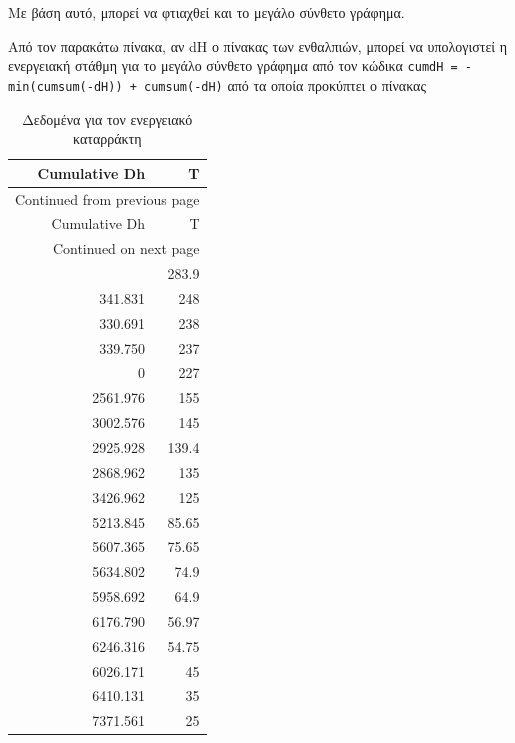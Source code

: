 \documentclass[11pt]{article}
\begin{document}
Με βάση αυτό, μπορεί να φτιαχθεί και το μεγάλο σύνθετο γράφημα.

Από τον παρακάτω πίνακα, αν dH ο πίνακας των ενθαλπιών, μπορεί να υπολογιστεί η ενεργειακή στάθμη για το μεγάλο σύνθετο γράφημα από τον κώδικα
\texttt{cumdH = -min(cumsum(-dH)) + cumsum(-dH)}
από τα οποία προκύπτει ο πίνακας

\begin{longtable}{rr}
\caption{Δεδομένα για τον ενεργειακό καταρράκτη}
\\
Cumulative  Dh & T\\
\hline
\endfirsthead
\multicolumn{2}{l}{Continued from previous page} \\
\hline

Cumulative  Dh & T \\

\hline
\endhead
\hline\multicolumn{2}{r}{Continued on next page} \\
\endfoot
\endlastfoot
\hline
213.165 & 283.9\\
341.831 & 248\\
330.691 & 238\\
339.750 & 237\\
0 & 227\\
2561.976 & 155\\
3002.576 & 145\\
2925.928 & 139.4\\
2868.962 & 135\\
3426.962 & 125\\
5213.845 & 85.65\\
5607.365 & 75.65\\
5634.802 & 74.9\\
5958.692 & 64.9\\
6176.790 & 56.97\\
6246.316 & 54.75\\
6026.171 & 45\\
6410.131 & 35\\
7371.561 & 25\\
\end{longtable}
\end{document}
